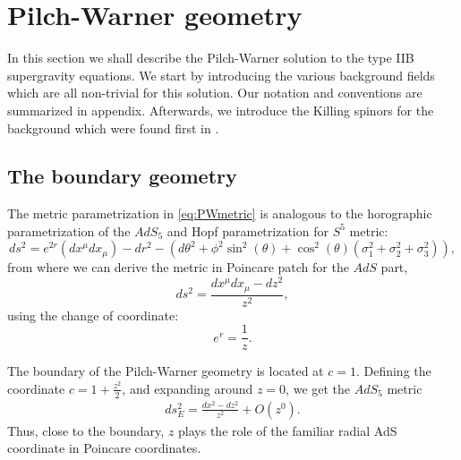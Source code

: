 \section{Pilch-Warner geometry}\label{sec:PWB}

In this section we shall describe the Pilch-Warner solution to the type IIB supergravity equations.
We start by introducing the various background fields which are all non-trivial for this solution.
Our notation and conventions are summarized in appendix.
Afterwards, we introduce the Killing spinors for the background which were found first in \cite{Pilch:2003jg}.

\subsection{The boundary geometry}

The metric parametrization in \eqref{eq:PWmetric} is analogous to the horographic parametrization of the $AdS_5$ and Hopf parametrization for $S^5$ metric:
\begin{equation*}
ds^2=e^{2 r}\left(dx^\mu dx_\mu \right)-dr^2 -\left(d\theta^2+\phi^2 \sin ^2(\theta )+\cos ^2(\theta ) \left(\sigma_1^2+\sigma_2^2+\sigma_3^2\right)\right),
\end{equation*}
from where we can derive the metric in Poincare patch for the $AdS$ part,
\begin{equation*}
ds^2=\frac{dx^{\mu } dx_{\mu}-dz^2}{z^2},
\end{equation*}{}
using the change of coordinate:
\begin{equation*}
e^r=\frac{1}{z}.
\end{equation*}{}


The boundary of the Pilch-Warner geometry is located at $c = 1$.
Defining the coordinate $c = 1 + \frac{z^2}{2}$, and expanding around $z = 0$, we get the $AdS_5$ metric
\begin{align}
ds_E^2 =
\frac{dx^2 - dz^2}{z^2} + O(z^{0}).
\end{align}
Thus, close to the boundary, $z$ plays the role of the familiar radial AdS coordinate in Poincare coordinates.





